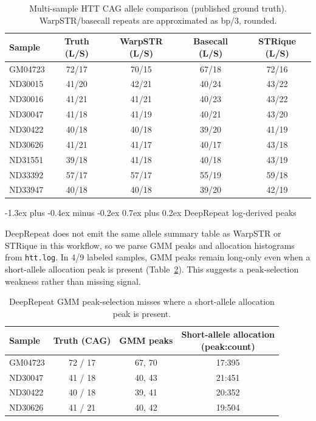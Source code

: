 \documentclass[sigconf]{acmart}
\makeatletter
\renewcommand\subsection{\@startsection{subsection}{2}{\z@}%
  {-1.3ex plus -0.4ex minus -0.2ex}%
  {0.7ex plus 0.2ex}%
  {\normalfont\normalsize\bfseries}}
\makeatother
\begin{document}
\begin{table}[t]
  \caption{Multi-sample HTT CAG allele comparison (published ground truth). WarpSTR/basecall repeats are approximated as bp/3, rounded.}
  \label{tab:multisample}
  \small
  \centering
  \setlength{\tabcolsep}{6pt}
  \renewcommand{\arraystretch}{1.15}
  \begin{tabular}{lcccc}
    \toprule
    Sample & Truth (L/S) & WarpSTR (L/S) & Basecall (L/S) & STRique (L/S) \\
    \midrule
    GM04723 & 72/17 & 70/15 & 67/18 & 72/16 \\
    ND30015 & 41/20 & 42/21 & 40/24 & 43/22 \\
    ND30016 & 41/21 & 41/21 & 40/23 & 43/22 \\
    ND30047 & 41/18 & 41/19 & 40/21 & 43/20 \\
    ND30422 & 40/18 & 40/18 & 39/20 & 41/19 \\
    ND30626 & 41/21 & 41/17 & 40/17 & 43/18 \\
    ND31551 & 39/18 & 41/18 & 40/18 & 43/19 \\
    ND33392 & 57/17 & 57/17 & 55/19 & 59/18 \\
    ND33947 & 40/18 & 40/18 & 39/20 & 42/19 \\
    \bottomrule
  \end{tabular}
\end{table}

\subsection{DeepRepeat log-derived peaks}

DeepRepeat does not emit the same allele summary table as WarpSTR or STRique in this workflow, so we parse GMM peaks and allocation histograms from \texttt{htt.log}. In 4/9 labeled samples, GMM peaks remain long-only even when a short-allele allocation peak is present (Table~\ref{tab:deeprepeat_missed_short}). This suggests a peak-selection weakness rather than missing signal.

\begin{table}[t]
  \caption{DeepRepeat GMM peak-selection misses where a short-allele allocation peak is present.}
  \label{tab:deeprepeat_missed_short}
  \footnotesize
  \centering
  \setlength{\tabcolsep}{4pt}
  \begin{tabular}{lccc}
    \toprule
    Sample & Truth (CAG) & GMM peaks & \shortstack{Short-allele allocation\\(peak:count)} \\
    \midrule
    GM04723 & 72 / 17 & 67, 70 & 17:395 \\
    ND30047 & 41 / 18 & 40, 43 & 21:451 \\
    ND30422 & 40 / 18 & 39, 41 & 20:352 \\
    ND30626 & 41 / 21 & 40, 42 & 19:504 \\
    \bottomrule
  \end{tabular}
\end{table}
\end{document}
